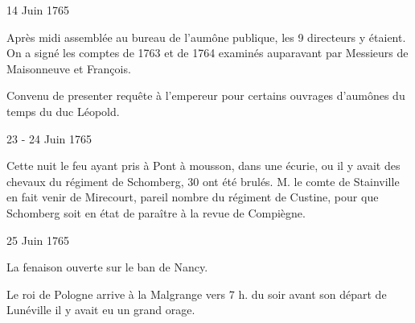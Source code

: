                      \begin{diary}{14 Juin 1765}{}
                        
                         Après midi assemblée au bureau de l'aumône
                              publique, les
                           9 directeurs y étaient. On a signé
                           les comptes de 1763 et de 1764 examinés auparavant
                           par Messieurs
                           de Maisonneuve et François. \bigskip
        
        
                         Convenu de presenter requête à l'empereur pour
                           certains ouvrages d'aumônes du temps du duc Léopold. \bigskip
        
        
                     \end{diary}
                     \begin{diary}{23 - 24 Juin 1765}{}
                        
                         Cette nuit le feu ayant pris à Pont à
                              mousson, dans
                           une écurie, ou il y avait des chevaux du régiment
                              de Schomberg, 30 ont été brulés. M. le comte de
                              Stainville en fait venir de Mirecourt, pareil
                           nombre du régiment de Custine, pour que Schomberg soit
                           en état de paraître à la revue de Compiègne. \bigskip
        
        
                     \end{diary}

                     \begin{diary}{25 Juin 1765}{}
                        
                         La fenaison ouverte sur le ban de
                              Nancy. \bigskip
        
        
                        
                           Le roi de Pologne arrive à la
                              Malgrange vers 7 h. du
                           soir avant son départ de Lunéville il y avait eu
                           un grand orage. \bigskip
        
        
                     \end{diary}

